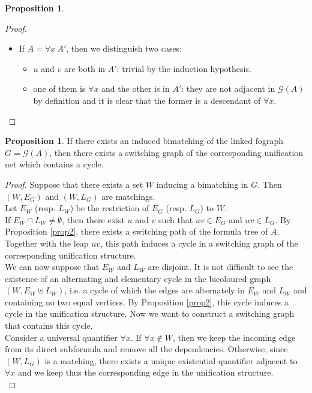 \documentclass[conference]{IEEEtran}
\theoremstyle{definition}
\newtheorem{proposition}[thm]{Proposition}
\newcommand{\Gr}{\mathcal{G}}
\begin{document}
\begin{proposition}
\begin{proof}
\begin{itemize}
\begin{itemize}
    \end{itemize}
  \item If $A = \forall x \ A'$, then we distinguish two cases:
    \begin{itemize}
      \item $u$ and $v$ are both in $A'$: trivial by the induction
	      hypothesis.
      \item one of them is $\forall x$ and the other is in $A'$:
	      they are not adjacent in $\Gr(A)$ by definition and it is clear that
		    the former is a descendant of $\forall x$.
    \end{itemize}
\end{itemize}
\end{proof}
\end{proposition}

\begin{proposition}
If there exists an induced bimatching of the linked fograph $G = \Gr(A)$, then there exists a switching graph of the corresponding unification net which contains a cycle.
\begin{proof}
  Suppose that there exists a set $W$ inducing a bimatching in $G$.
  Then $(W, E_G)$ and $(W, L_G)$ are matchings.\\
  Let $E_W$ (resp. $L_W$) be the restriction of $E_G$ (resp. $L_G$) to $W$. \\
  If $E_W \cap L_W \neq \emptyset$, then there exist $u$ and $v$ such that $uv
  \in E_G$ and $uv \in L_G$. By Proposition \ref{prop2}, there exists a
  switching path of the formula tree of $A$. Together with the leap
  $uv$, this path induces a cycle in a switching graph of the
  corresponding unification structure. \\
  We can now suppose that $E_W$ and $L_W$ are disjoint. It is not difficult to
  see the existence of an alternating and elementary cycle in the bicoloured graph $(W, E_W \uplus L_W)$, i.e. a cycle of which the edges are alternately in $E_W$ and $L_W$ and containing no two equal vertices.
  By Proposition \ref{prop2}, this cycle induces a cycle in the unification
  structure. Now we want to construct a switching graph that contains this cycle.\\
  Consider a universal quantifier $\forall x$. If $\forall x \notin W$, then        
  we keep the incoming edge from its direct subformula and remove all the 
  dependencies. Otherwise, since $(W, L_G)$ is a matching, there exists a
  unique existential quantifier adjacent to $\forall x$ and we keep thus the
  corresponding edge in the unification structure. \\

\end{proof}
\end{proposition}
\end{document}
